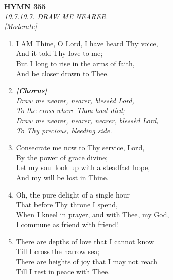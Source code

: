 \documentclass[11pt,a4paper]{article}
\begin{document}
\newpage
\begin{center}
    {\Large \textbf{HYMN 355}}
    \\
    \textit{10.7.10.7. DRAW ME NEARER}
    \\
    \textit{\small [Moderate]}
\end{center}
\vspace{1em}

\begin{enumerate}
    \item I AM Thine, O Lord, I have heard Thy voice, \\
        And it told Thy love to me; \\
        But I long to rise in the arms of faith, \\
        And be closer drawn to Thee.

    \item[] \vspace{0.4em}
    \textbf{\textit{[Chorus]}} \\
    \textit{Draw me nearer, nearer, bless\`ed Lord,} \\
    \textit{To the cross where Thou hast died;} \\
    \textit{Draw me nearer, nearer, nearer, bless\`ed Lord,} \\
    \textit{To Thy precious, bleeding side.}
    \vspace{0.4em}

    \item Consecrate me now to Thy service, Lord, \\
        By the power of grace divine; \\
        Let my soul look up with a steadfast hope, \\
        And my will be lost in Thine.

    \item Oh, the pure delight of a single hour \\
        That before Thy throne I spend, \\
        When I kneel in prayer, and with Thee, my God, \\
        I commune as friend with friend!

    \item There are depths of love that I cannot know \\
        Till I cross the narrow sea; \\
        There are heights of joy that I may not reach \\
        Till I rest in peace with Thee.

\end{enumerate}
\end{document}

